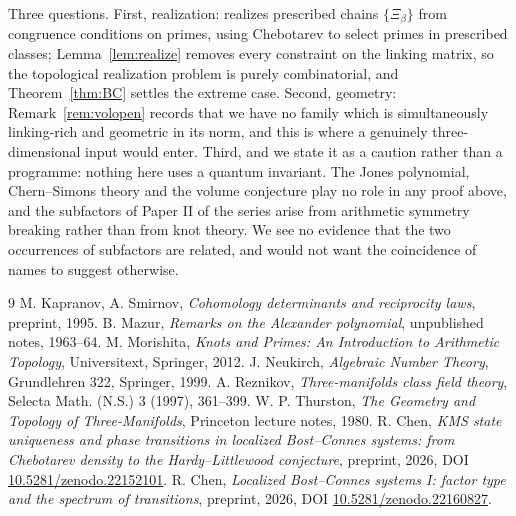 \documentclass[11pt]{amsart}
\numberwithin{equation}{section}
\theoremstyle{definition}
\theoremstyle{remark}
\begin{document}
Three questions. First, realization: \cite[Thm.~5.1]{SeriesI} realizes prescribed chains
$\{\Xi_\beta\}$ from congruence conditions on primes, using Chebotarev to select primes in
prescribed classes; Lemma~\ref{lem:realize} removes every constraint on the linking matrix,
so the topological realization problem is purely combinatorial, and Theorem~\ref{thm:BC}
settles the extreme case. Second, geometry: Remark~\ref{rem:volopen} records that we have no
family which is simultaneously linking-rich and geometric in its norm, and this is where a
genuinely three-dimensional input would enter. Third, and we state it as a caution rather than a
programme: nothing here uses a quantum invariant. The Jones polynomial, Chern--Simons theory
and the volume conjecture play no role in any proof above, and the subfactors of Paper II
of the series arise from arithmetic symmetry breaking rather than from knot theory. We
see no evidence that the two occurrences of subfactors are related, and would not want the
coincidence of names to suggest otherwise.

\begin{thebibliography}{9}
 M. Kapranov, A. Smirnov, \emph{Cohomology determinants and reciprocity laws}, preprint, 1995.
 B. Mazur, \emph{Remarks on the Alexander polynomial}, unpublished notes, 1963--64.
 M. Morishita, \emph{Knots and Primes: An Introduction to Arithmetic Topology}, Universitext, Springer, 2012.
 J. Neukirch, \emph{Algebraic Number Theory}, Grundlehren 322, Springer, 1999.
 A. Reznikov, \emph{Three-manifolds class field theory}, Selecta Math. (N.S.) 3 (1997), 361--399.
 W. P. Thurston, \emph{The Geometry and Topology of Three-Manifolds}, Princeton lecture notes, 1980.
 R. Chen, \emph{KMS state uniqueness and phase transitions in localized Bost--Connes systems: from Chebotarev density to the Hardy--Littlewood conjecture}, preprint, 2026, DOI \href{https://doi.org/10.5281/zenodo.22152101}{10.5281/zenodo.22152101}.
 R. Chen, \emph{Localized Bost--Connes systems I: factor type and the spectrum of transitions}, preprint, 2026, DOI \href{https://doi.org/10.5281/zenodo.22160827}{10.5281/zenodo.22160827}.
\end{thebibliography}
\end{document}
